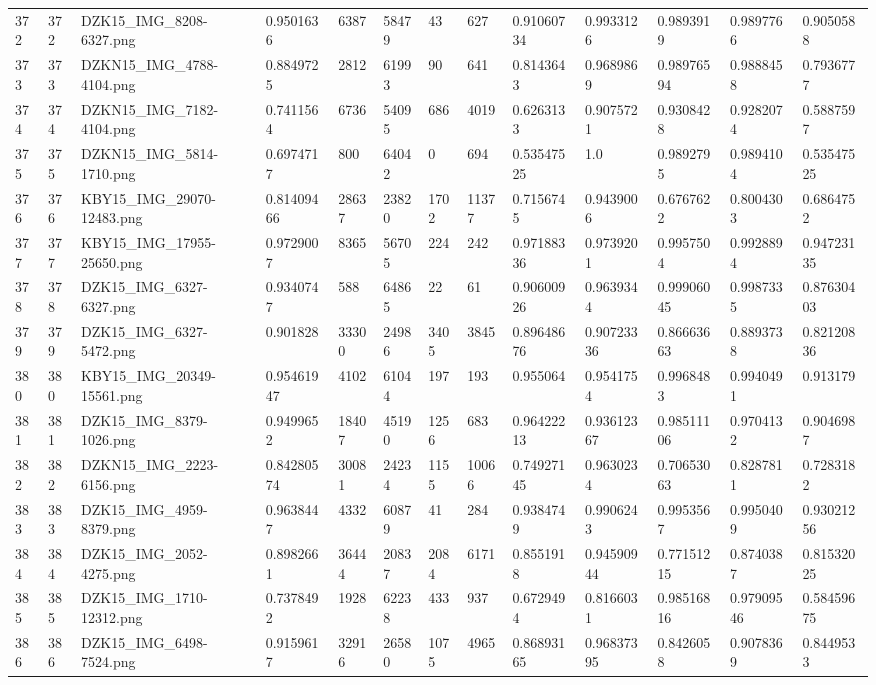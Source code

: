 \documentclass[11pt, a4paper, twoside]{report}
\begin{document}
\begin{longtable}[c]{@{}lllllllllllll@{}}
372 & 372 & DZK15\_IMG\_8208-6327.png & 0.9501636 & 6387 & 58479 & 43 & 627 & 0.91060734 & 0.9933126 & 0.9893919 & 0.9897766 & 0.9050588 \\
373 & 373 & DZKN15\_IMG\_4788-4104.png & 0.8849725 & 2812 & 61993 & 90 & 641 & 0.8143643 & 0.9689869 & 0.98976594 & 0.9888458 & 0.7936777 \\
374 & 374 & DZKN15\_IMG\_7182-4104.png & 0.7411564 & 6736 & 54095 & 686 & 4019 & 0.6263133 & 0.9075721 & 0.9308428 & 0.9282074 & 0.5887597 \\
375 & 375 & DZKN15\_IMG\_5814-1710.png & 0.6974717 & 800 & 64042 & 0 & 694 & 0.53547525 & 1.0 & 0.9892795 & 0.9894104 & 0.53547525 \\
376 & 376 & KBY15\_IMG\_29070-12483.png & 0.81409466 & 28637 & 23820 & 1702 & 11377 & 0.7156745 & 0.9439006 & 0.6767622 & 0.8004303 & 0.6864752 \\
377 & 377 & KBY15\_IMG\_17955-25650.png & 0.9729007 & 8365 & 56705 & 224 & 242 & 0.97188336 & 0.9739201 & 0.9957504 & 0.9928894 & 0.94723135 \\
378 & 378 & DZK15\_IMG\_6327-6327.png & 0.9340747 & 588 & 64865 & 22 & 61 & 0.90600926 & 0.9639344 & 0.99906045 & 0.9987335 & 0.87630403 \\
379 & 379 & DZK15\_IMG\_6327-5472.png & 0.901828 & 33300 & 24986 & 3405 & 3845 & 0.89648676 & 0.90723336 & 0.86663663 & 0.8893738 & 0.82120836 \\
380 & 380 & KBY15\_IMG\_20349-15561.png & 0.95461947 & 4102 & 61044 & 197 & 193 & 0.955064 & 0.9541754 & 0.9968483 & 0.9940491 & 0.913179 \\
381 & 381 & DZK15\_IMG\_8379-1026.png & 0.9499652 & 18407 & 45190 & 1256 & 683 & 0.96422213 & 0.93612367 & 0.98511106 & 0.9704132 & 0.9046987 \\
382 & 382 & DZKN15\_IMG\_2223-6156.png & 0.84280574 & 30081 & 24234 & 1155 & 10066 & 0.74927145 & 0.9630234 & 0.70653063 & 0.8287811 & 0.7283182 \\
383 & 383 & DZK15\_IMG\_4959-8379.png & 0.9638447 & 4332 & 60879 & 41 & 284 & 0.9384749 & 0.9906243 & 0.9953567 & 0.9950409 & 0.93021256 \\
384 & 384 & DZK15\_IMG\_2052-4275.png & 0.8982661 & 36444 & 20837 & 2084 & 6171 & 0.8551918 & 0.94590944 & 0.77151215 & 0.8740387 & 0.81532025 \\
385 & 385 & DZK15\_IMG\_1710-12312.png & 0.7378492 & 1928 & 62238 & 433 & 937 & 0.6729494 & 0.8166031 & 0.98516816 & 0.97909546 & 0.58459675 \\
386 & 386 & DZK15\_IMG\_6498-7524.png & 0.9159617 & 32916 & 26580 & 1075 & 4965 & 0.86893165 & 0.96837395 & 0.8426058 & 0.9078369 & 0.8449533 \\

\end{longtable}
\end{document}
